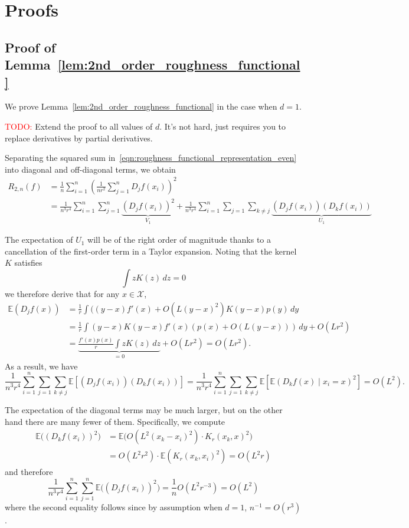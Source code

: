 \documentclass{article}
\newcommand{\1}{\mathbf{1}}
\newcommand{\Ebb}{\mathbb{E}}
\theoremstyle{alden}
\theoremstyle{aldenthm}
\theoremstyle{definition}
\theoremstyle{remark}
\begin{document}
\section{Proofs}
\subsection{Proof of Lemma~\ref{lem:2nd_order_roughness_functional}}
We prove Lemma~\ref{lem:2nd_order_roughness_functional} in the case when $d = 1$.

\textcolor{red}{TODO:} Extend the proof to all values of $d$. It's not hard, just requires you to replace derivatives by partial derivatives.

Separating the squared sum in~\eqref{eqn:roughness_functional_representation_even} into diagonal and off-diagonal terms, we obtain
\begin{align*}
R_{2,n}(f) & = \frac{1}{n}\sum_{i = 1}^{n}\left(\frac{1}{nr^2}\sum_{j = 1}^{n} D_jf(x_i)\right)^2 \\
& = \frac{1}{n^3r^4}\sum_{i = 1}^{n} \sum_{j = 1}^{n}\underbrace{(D_jf(x_i))^2}_{V_1} + \frac{1}{n^3r^4}\sum_{i = 1}^{n} \sum_{j = 1} \sum_{k \neq j}\underbrace{(D_jf(x_i))(D_kf(x_i))}_{U_1}
\end{align*}

The expectation of $U_1$ will be of the right order of magnitude thanks to a cancellation of the first-order term in a Taylor expansion. Noting that the kernel $K$ satisfies
\begin{equation*}
\int z K(z) \,dz = 0
\end{equation*}
we therefore derive that for any $x \in \mathcal{X}$,
\begin{align*}
\mathbb{E}(D_jf(x)) & = \frac{1}{r}\int ((y - x)f'(x) + O(L(y-x)^2) K(y - x) p(y) \,dy \tag{by $f \in C^2(L)$} \\
& = \frac{1}{r}\int(y - x)K(y - x)f'(x)(p(x) + O(L(y - x))) \,dy + O(Lr^2)  \tag{by $p \in C^1(L)$}\\
& = \underbrace{\frac{f'(x) p(x)}{r} \int z K(z) \,dz}_{= 0} + O(Lr^2) = O(Lr^2).
\end{align*}
As a result, we have
\begin{equation*}
\frac{1}{n^3r^4}\sum_{i = 1}^{n} \sum_{j = 1} \sum_{k \neq j} \Ebb\left[(D_jf(x_i))(D_kf(x_i))\right] = \frac{1}{n^3r^4}\sum_{i = 1}^{n} \sum_{j = 1} \sum_{k \neq j} \Ebb\left[ \Ebb(D_kf(x)\mid x_i = x)^2\right] = O(L^2).
\end{equation*}

The expectation of the diagonal terms may be much larger, but on the other hand there are many fewer of them. Specifically, we compute
\begin{align*}
\Ebb\bigl((D_kf(x_i))^2\bigr) & = \Ebb\biggl(O\left(L^2(x_k - x_i)^2\right)\cdot K_r(x_k,x)^2\biggr) \\
& = O(L^2r^2)\cdot\Ebb(K_r(x_k,x_i)^2) = O(L^2 r)
\end{align*}
and therefore
\begin{equation*}
\frac{1}{n^3r^4}\sum_{i = 1}^{n} \sum_{j = 1}^{n} \Ebb\bigl((D_jf(x_i))^2\bigr) = \frac{1}{n} O(L^2 r^{-3}) = O(L^2)
\end{equation*}
where the second equality follows since by assumption when $d = 1$, $n^{-1} = O(r^{3})$. 
\end{document}

